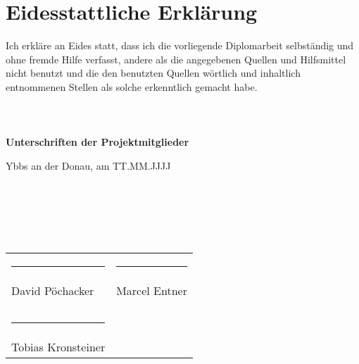 \chapter*{Eidesstattliche Erklärung} 

Ich erkläre an Eides statt, dass ich die vorliegende Diplomarbeit selbständig und ohne fremde Hilfe verfasst, 
andere als die angegebenen Quellen und Hilfsmittel nicht benutzt und die den benutzten Quellen wörtlich und inhaltlich entnommenen Stellen 
als solche erkenntlich gemacht habe.
\\\\\\\\

\textbf{Unterschriften der Projektmitglieder}

Ybbs an der Donau, am TT.MM.JJJJ
\\\\\\\\\\\\

\begin{table}[ht]
  \begin{tabular}{p{8cm} p{8cm}}
    \rule{6cm}{0.01cm} & \rule{6cm}{0.01cm}\\
    David Pöchacker & Marcel Entner\\
    \\
    \\
    \rule{6cm}{0.01cm} \\
    Tobias Kronsteiner 
  \end{tabular}
\end{table}
